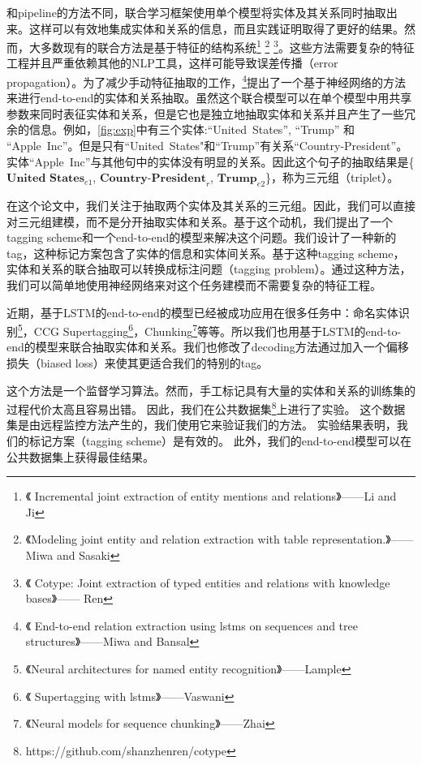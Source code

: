 \documentclass[a4paper,UTF8,no-math]{ctexart}
\begin{document}
	和pipeline的方法不同，联合学习框架使用单个模型将实体及其关系同时抽取出来。这样可以有效地集成实体和关系的信息，而且实践证明取得了更好的结果。然而，大多数现有的联合方法是基于特征的结构系统\footnote{《 Incremental joint extraction of entity mentions and relations》——Li and  Ji } \footnote{《Modeling joint entity and relation extraction with table representation.》—— Miwa and  Sasaki} \footnote{《 Cotype: Joint extraction of typed entities and relations with knowledge bases》——  Ren}。这些方法需要复杂的特征工程并且严重依赖其他的NLP工具，这样可能导致误差传播（error propagation）。为了减少手动特征抽取的工作，\footnote{《 End-to-end relation extraction using lstms on sequences and tree structures》——Miwa and Bansal}提出了一个基于神经网络的方法来进行end-to-end的实体和关系抽取。虽然这个联合模型可以在单个模型中用共享参数来同时表征实体和关系，但是它也是独立地抽取实体和关系并且产生了一些冗余的信息。例如，\autoref{fig:exp}中有三个实体:``United~States'', ``Trump'' 和 ``Apple~Inc''。但是只有``United~States"和``Trump''有关系``Country-President''。实体``Apple~Inc''与其他句中的实体没有明显的关系。因此这个句子的抽取结果是\{$\textbf{United~States}_{e1}$, $\textbf{Country-President}_{r}$, $\textbf{Trump}_{e2}$\}，称为三元组（triplet）。
	
	在这个论文中，我们关注于抽取两个实体及其关系的三元组。因此，我们可以直接对三元组建模，而不是分开抽取实体和关系。基于这个动机，我们提出了一个tagging scheme和一个end-to-end的模型来解决这个问题。我们设计了一种新的tag，这种标记方案包含了实体的信息和实体间关系。基于这种tagging scheme，实体和关系的联合抽取可以转换成标注问题（tagging problem）。通过这种方法，我们可以简单地使用神经网络来对这个任务建模而不需要复杂的特征工程。
	
	
	近期，基于LSTM的end-to-end的模型已经被成功应用在很多任务中：命名实体识别\footnote{《Neural architectures for named entity recognition》——Lample}，CCG Supertagging\footnote{《 Supertagging with lstms》——Vaswani}，Chunking\footnote{《Neural models for sequence chunking》——Zhai}等等。所以我们也用基于LSTM的end-to-end的模型来联合抽取实体和关系。我们也修改了decoding方法通过加入一个偏移损失（biased loss）来使其更适合我们的特别的tag。
	
	这个方法是一个监督学习算法。然而，手工标记具有大量的实体和关系的训练集的过程代价太高且容易出错。
	因此，我们在公共数据集\footnote{https://github.com/shanzhenren/cotype}上进行了实验。
	这个数据集是由远程监控方法产生的，我们使用它来验证我们的方法。
	实验结果表明，我们的标记方案（tagging scheme）是有效的。
	此外，我们的end-to-end模型可以在公共数据集上获得最佳结果。
	
\end{document}
